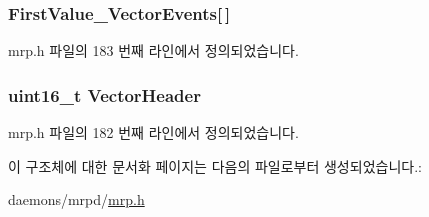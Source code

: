 \subsubsection[{\texorpdfstring{First\+Value\+\_\+\+Vector\+Events}{FirstValue_VectorEvents}}]{ First\+Value\+\_\+\+Vector\+Events\mbox{[}$\,$\mbox{]}}\hypertarget{structmrpdu__vectorattrib_aadb45c52c58d863f199ba2cb4e450e6d}{}\label{structmrpdu__vectorattrib_aadb45c52c58d863f199ba2cb4e450e6d}


mrp.\+h 파일의 183 번째 라인에서 정의되었습니다.

\subsubsection[{\texorpdfstring{Vector\+Header}{VectorHeader}}]{\setlength{\rightskip}{0pt plus 5cm}uint16\+\_\+t Vector\+Header}\hypertarget{structmrpdu__vectorattrib_af3ce9d09162a6ac7a51a5e8ef1166f94}{}\label{structmrpdu__vectorattrib_af3ce9d09162a6ac7a51a5e8ef1166f94}


mrp.\+h 파일의 182 번째 라인에서 정의되었습니다.



이 구조체에 대한 문서화 페이지는 다음의 파일로부터 생성되었습니다.\+:\begin{DoxyCompactItemize}
\item 
daemons/mrpd/\hyperlink{mrp_8h}{mrp.\+h}\end{DoxyCompactItemize}
